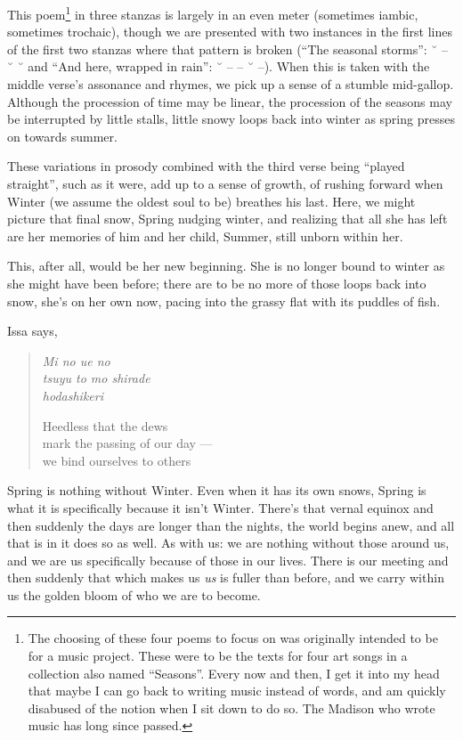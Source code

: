 \documentclass[12pt,oneside]{memoir}
\begin{document}
This poem\footnote{The choosing of these four poems to focus on was originally intended to be for a music project. These were to be the texts for four art songs in a collection also named ``Seasons''. Every now and then, I get it into my head that maybe I can go back to writing music instead of words, and am quickly disabused of the notion when I sit down to do so. The Madison who wrote music has long since passed.} in three stanzas is largely in an even meter (sometimes iambic, sometimes trochaic), though we are presented with two instances in the first lines of the first two stanzas where that pattern is broken (``The seasonal storms'': ˘ -- ˘ ˘ and ``And here, wrapped in rain'': ˘ -- -- ˘ --). When this is taken with the middle verse's assonance and rhymes, we pick up a sense of a stumble mid-gallop. Although the procession of time may be linear, the procession of the seasons may be interrupted by little stalls, little snowy loops back into winter as spring presses on towards summer.

These variations in prosody combined with the third verse being ``played straight'', such as it were, add up to a sense of growth, of rushing forward when Winter (we assume the oldest soul to be) breathes his last. Here, we might picture that final snow, Spring nudging winter, and realizing that all she has left are her memories of him and her child, Summer, still unborn within her.

This, after all, would be her new beginning. She is no longer bound to winter as she might have been before; there are to be no more of those loops back into snow, she's on her own now, pacing into the grassy flat with its puddles of fish.

Issa says,

\begin{verse}
\emph{Mi no ue no} \\
\emph{tsuyu to mo shirade} \\
\emph{hodashikeri}

Heedless that the dews \\
mark the passing of our day --- \\
we bind ourselves to others

\parencite[11]{issa}
\end{verse}

Spring is nothing without Winter. Even when it has its own snows, Spring is what it is specifically because it isn't Winter. There's that vernal equinox and then suddenly the days are longer than the nights, the world begins anew, and all that is in it does so as well. As with us: we are nothing without those around us, and we are us specifically because of those in our lives. There is our meeting and then suddenly that which makes us \emph{us} is fuller than before, and we carry within us the golden bloom of who we are to become.
\end{document}
